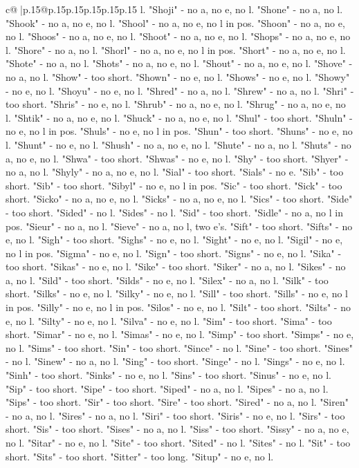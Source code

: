 \documentclass{article}
\begin{document}
{\begin{supertabular}{c@{$\;$}|p{.15\linewidth}@{}p{.15\linewidth}p{.15\linewidth}p{.15\linewidth}p{.15\linewidth}p{.15\linewidth}}
{{{l. "Shoji" {-} no a, no e, no l. "Shone" {-} no a, no l. "Shook" {-} no a, no e, no l. "Shool" {-} no a, no e, no l in pos. "Shoon" {-} no a, no e, no l. "Shoos" {-} no a, no e, no l. "Shoot" {-} no a, no e, no l. "Shops" {-} no a, no e, no l. "Shore" {-} no a, no l. "Shorl" {-} no a, no e, no l in pos. "Short" {-} no a, no e, no l. "Shote" {-} no a, no l. "Shots" {-} no a, no e, no l. "Shout" {-} no a, no e, no l. "Shove" {-} no a, no l. "Show" {-} too short. "Shown" {-} no e, no l. "Shows" {-} no e, no l. "Showy" {-} no e, no l. "Shoyu" {-} no e, no l. "Shred" {-} no a, no l. "Shrew" {-} no a, no l. "Shri" {-} too short. "Shris" {-} no e, no l. "Shrub" {-} no a, no e, no l. "Shrug" {-} no a, no e, no l. "Shtik" {-} no a, no e, no l. "Shuck" {-} no a, no e, no l. "Shul" {-} too short. "Shuln" {-} no e, no l in pos. "Shuls" {-} no e, no l in pos. "Shun" {-} too short. "Shuns" {-} no e, no l. "Shunt" {-} no e, no l. "Shush" {-} no a, no e, no l. "Shute" {-} no a, no l. "Shuts" {-} no a, no e, no l. "Shwa" {-} too short. "Shwas" {-} no e, no l. "Shy" {-} too short. "Shyer" {-} no a, no l. "Shyly" {-} no a, no e, no l. "Sial" {-} too short. "Sials" {-} no e. "Sib" {-} too short. "Sib" {-} too short. "Sibyl" {-} no e, no l in pos. "Sic" {-} too short. "Sick" {-} too short. "Sicko" {-} no a, no e, no l. "Sicks" {-} no a, no e, no l. "Sics" {-} too short. "Side" {-} too short. "Sided" {-} no l. "Sides" {-} no l. "Sid" {-} too short. "Sidle" {-} no a, no l in pos. "Sieur" {-} no a, no l. "Sieve" {-} no a, no l, two e's. "Sift" {-} too short. "Sifts" {-} no e, no l. "Sigh" {-} too short. "Sighs" {-} no e, no l. "Sight" {-} no e, no l. "Sigil" {-} no e, no l in pos. "Sigma" {-} no e, no l. "Sign" {-} too short. "Signs" {-} no e, no l. "Sika" {-} too short. "Sikas" {-} no e, no l. "Sike" {-} too short. "Siker" {-} no a, no l. "Sikes" {-} no a, no l. "Sild" {-} too short. "Silds" {-} no e, no l. "Silex" {-} no a, no l. "Silk" {-} too short. "Silks" {-} no e, no l. "Silky" {-} no e, no l. "Sill" {-} too short. "Sills" {-} no e, no l in pos. "Silly" {-} no e, no l in pos. "Silos" {-} no e, no l. "Silt" {-} too short. "Silts" {-} no e, no l. "Silty" {-} no e, no l. "Silva" {-} no e, no l. "Sim" {-} too short. "Sima" {-} too short. "Simar" {-} no e, no l. "Simas" {-} no e, no l. "Simp" {-} too short. "Simps" {-} no e, no l. "Sims" {-} too short. "Sin" {-} too short. "Since" {-} no l. "Sine" {-} too short. "Sines" {-} no l. "Sinew" {-} no a, no l. "Sing" {-} too short. "Singe" {-} no l. "Sings" {-} no e, no l. "Sinh" {-} too short. "Sinks" {-} no e, no l. "Sins" {-} too short. "Sinus" {-} no e, no l. "Sip" {-} too short. "Sipe" {-} too short. "Siped" {-} no a, no l. "Sipes" {-} no a, no l. "Sips" {-} too short. "Sir" {-} too short. "Sire" {-} too short. "Sired" {-} no a, no l. "Siren" {-} no a, no l. "Sires" {-} no a, no l. "Siri" {-} too short. "Siris" {-} no e, no l. "Sirs" {-} too short. "Sis" {-} too short. "Sises" {-} no a, no l. "Siss" {-} too short. "Sissy" {-} no a, no e, no l. "Sitar" {-} no e, no l. "Site" {-} too short. "Sited" {-} no l. "Sites" {-} no l. "Sit" {-} too short. "Sits" {-} too short. "Sitter" {-} too long. "Situp" {-} no e, no l. }}}
\end{supertabular}}
\end{document}

